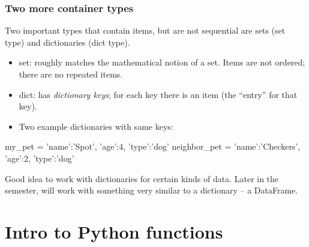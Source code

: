 \documentclass{beamer}
\newenvironment{codeblock}
    {\hfill\begin{beamerboxesrounded}[lower=codecol, width=0.8\textwidth]
    \medskip

    }
    { 
    \end{beamerboxesrounded}\hfill
    }
\theoremstyle{example}
\begin{document}
\begin{frame}[fragile]
\frametitle{Two more container types}

Two important types that contain items, but are not sequential are sets ({\ttb set} type) and dictionaries ({\ttb dict} type).

\begin{itemize}
	\item {\ttb set}: roughly matches the mathematical notion of a set. Items are not ordered; there are no repeated items.
	\item {\ttb dict}: has \emph{dictionary keys}; for each key there is an item (the ``entry'' for that key).
	\item Two example dictionaries with same keys:
\end{itemize}

\begin{codeblock}

\begin{python}
my_pet = {'name':'Spot', 'age':4, 'type':'dog'}
neighbor_pet = {'name':'Checkers', 'age':2, 'type':'dog'}
\end{python}

\end{codeblock}

\vspace*{12pt}
Good idea to work with dictionaries for certain kinds of data. Later in the semester, will work with something very similar to a dictionary {--} a DataFrame.
\end{frame}

\section{Intro to Python functions}
\end{document}
